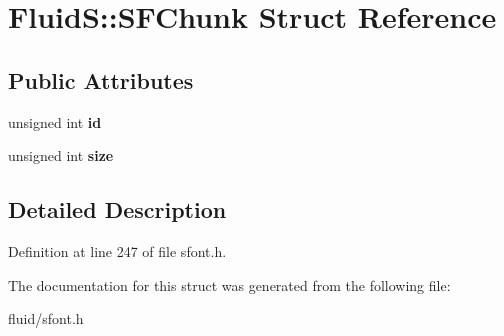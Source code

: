 \hypertarget{struct_fluid_s_1_1_s_f_chunk}{}\section{FluidS\+:\+:S\+F\+Chunk Struct Reference}
\label{struct_fluid_s_1_1_s_f_chunk}
\subsection*{Public Attributes}
\begin{DoxyCompactItemize}
\item 
\mbox{\label{struct_fluid_s_1_1_s_f_chunk_a3f93c46708965e0d72d523b80db02db6}} 
unsigned int {\bfseries id}
\item 
\mbox{\label{struct_fluid_s_1_1_s_f_chunk_a66f8a57659e29acc7c85bb20aa99624e}} 
unsigned int {\bfseries size}
\end{DoxyCompactItemize}


\subsection{Detailed Description}


Definition at line 247 of file sfont.\+h.



The documentation for this struct was generated from the following file\+:\begin{DoxyCompactItemize}
\item 
fluid/sfont.\+h\end{DoxyCompactItemize}
